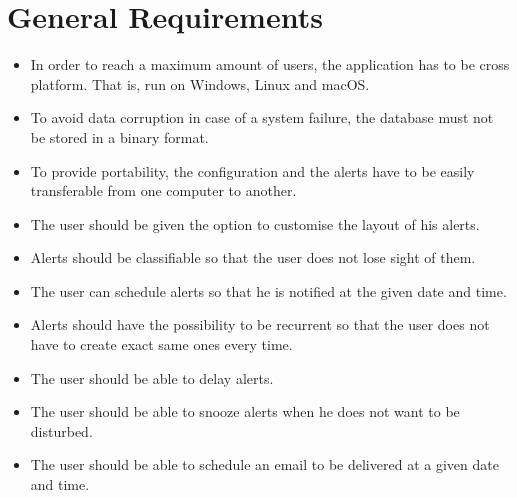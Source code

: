 \section{General Requirements}

\begin{itemize}
    \item In order to reach a maximum amount of users, the application has to
        be cross platform. That is, run on Windows, Linux and macOS.\@
    \item To avoid data corruption in case of a system failure, the database
        must not be stored in a binary format.
    \item To provide portability, the configuration and the alerts have to be
        easily transferable from one computer to another.
    \item The user should be given the option to customise the layout of his
        alerts.
    \item Alerts should be classifiable so that the user does not lose sight of
        them.
    \item The user can schedule alerts so that he is notified at the given date
        and time.
    \item Alerts should have the possibility to be recurrent so that the
        user does not have to create exact same ones every time.
    \item The user should be able to delay alerts.
    \item The user should be able to snooze alerts when he does not want to be
        disturbed.
    \item The user should be able to schedule an email to be delivered at a
        given date and time.

\end{itemize}

